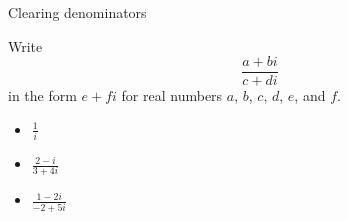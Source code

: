 \documentclass{beamer}
\begin{document}
\begin{frame}{Clearing denominators}
\begin{example}[Exemplar]
Write 
\begin{equation*}
\frac{a+bi}{c+di}
\end{equation*}
in the form $e+fi$ for real numbers $a$, $b$, $c$, $d$, $e$, and $f$.
\end{example}
\begin{itemize}
\item $\frac{1}{i}$ %
\item $\frac{2-i}{3+4i}$ %
\item $\frac{1-2i}{-2+5i}$ %
\end{itemize}
\end{frame}
\end{document}
